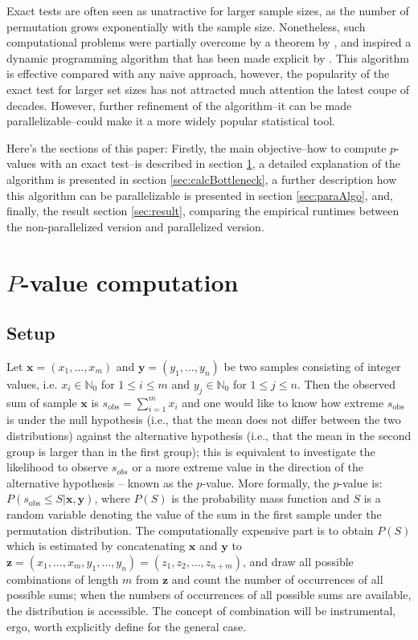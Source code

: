 \documentclass[a4paper,11pt]{article}
\begin{document}
Exact tests are often seen as unatractive for larger sample sizes, as the number of permutation grows exponentially with the sample size. Nonetheless, such computational problems were partially overcome by a theorem by \cite{pagano_trichtler1983}, and inspired a dynamic programming algorithm that has been made explicit by \cite{zimmermann1985}. This algorithm is effective compared with any naive approach, however, the popularity of the exact test for larger set sizes has not attracted much attention the latest coupe of decades. However, further refinement of the algorithm–it can be made parallelizable–could make it a more widely popular statistical tool.

Here's the sections of this paper: Firstly, the main objective–how to compute $p$-values with an exact test–is described in section \ref{sec:PvalueComputation}, a detailed explanation of the algorithm is presented in section \ref{sec:calcBottleneck}, a further description how this algorithm can be parallelizable is presented in section \ref{sec:paraAlgo}, and, finally, the result section \ref{sec:result}, comparing the empirical runtimes between the non-parallelized version and parallelized version.

\section{$P$-value computation}
\label{sec:PvalueComputation}
\subsection{Setup}
Let $\bm{x}=(x_1,\ldots, x_m)$ and $\bm{y}=(y_1,\ldots,y_n)$ be two samples consisting of integer values, i.e. $x_i \in \mathbb{N}_0$ for $1\leq i \leq m$ and $y_j \in \mathbb{N}_0$ for $1\leq j\leq n$. Then the observed sum of sample $\bm{x}$ is $s_{\text{obs}} = \sum_{i=1}^m x_i$ and one would like to know how extreme $s_{\text{obs}}$ is under the null hypothesis (i.e., that the mean does not differ between the two distributions) against the alternative hypothesis (i.e., that the mean in the second group is larger than in the first group); this is equivalent to investigate the likelihood to observe $s_{obs}$ or a more extreme value in the direction of the alternative hypothesis – known as the $p$-value. More formally, the $p$-value is: $P(s_{\text{obs}} \leq S | \bm{x}, \bm{y})$, where $P(S)$ is the probability mass function and $S$ is a random variable denoting the value of the sum in the first sample under the permutation distribution. The computationally expensive part is to obtain $P(S)$ which is estimated by concatenating $\bm{x}$ and $\bm{y}$ to $\bm{z}=(x_{1},\ldots,x_{m},y_{1},\ldots,y_{n})=(z_1, z_2, \ldots, z_{n+m})$, and draw all possible combinations of length $m$ from $\bm{z}$ and count the number of occurrences of all possible sums; when the numbers of occurrences of all possible sums are available, the distribution is accessible. The concept of combination will be instrumental, ergo, worth explicitly define for the general case.
\end{document}
